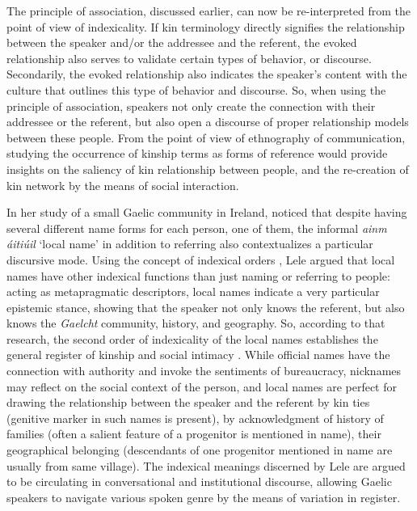 \documentclass[12pt, draft]{article}
\begin{document}
The principle of association, discussed earlier, can now be re-interpreted from the point of view of indexicality. If kin terminology directly signifies the relationship between the speaker and/or the addressee and the referent, the evoked relationship also serves to validate certain types of behavior, or discourse. Secondarily, the evoked relationship also indicates the speaker's content with the culture that outlines this type of behavior and discourse. So, when using the principle of association, speakers not only create the connection with their addressee or the referent, but also open a discourse of proper relationship models between these people. From the point of view of ethnography of communication, studying the occurrence of kinship terms as forms of reference would provide insights on the saliency of kin relationship between people, and the re-creation of kin network by the means of social interaction.

In her study of a small Gaelic community in Ireland, \textcite{lele2009} noticed that despite having several different name forms for each person, one of them, the informal \textit{ainm \'aiti\'uil} `local name' in addition to referring also contextualizes a particular discursive mode. Using the concept of indexical orders \parencite{silverstein2003}, Lele argued that local names have other indexical functions than just naming or referring to people: acting as metapragmatic descriptors, local names indicate a very particular epistemic stance, showing that the speaker not only knows the referent, but also knows the \textit{Gaelcht} community, history, and geography. So, according to that research, the second order of indexicality of the local names establishes the general register of kinship and social intimacy \parencite{lele2009}. While official names have the connection with authority and invoke the sentiments of bureaucracy, nicknames may reflect on the social context of the person, and local names are perfect for drawing the relationship between the speaker and the referent by kin ties (genitive marker in such names is present), by acknowledgment of history of families (often a salient feature of a progenitor is mentioned in name), their geographical belonging (descendants of one progenitor mentioned in name are usually from same village). The indexical meanings discerned by Lele are argued to be circulating in conversational and institutional discourse, allowing Gaelic speakers to navigate various spoken genre by the means of variation in register.
\end{document}

